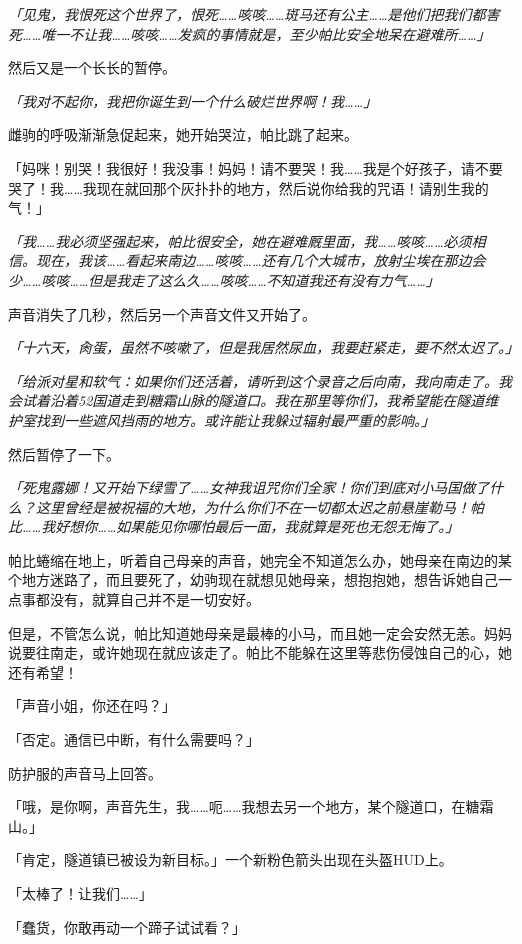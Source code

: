 \emph{「见鬼，我恨死这个世界了，恨死……咳咳……斑马还有公主……是他们把我们都害死……唯一不让我……咳咳……发疯的事情就是，至少帕比安全地呆在避难所……」}

然后又是一个长长的暂停。

\emph{「我对不起你，我把你诞生到一个什么破烂世界啊！我……」}

雌驹的呼吸渐渐急促起来，她开始哭泣，帕比跳了起来。

「妈咪！别哭！我很好！我没事！妈妈！请不要哭！我……我是个好孩子，请不要哭了！我……我现在就回那个灰扑扑的地方，然后说你给我的咒语！请别生我的气！」

\emph{「我……我必须坚强起来，帕比很安全，她在避难厩里面，我……咳咳……必须相信。现在，我该……看起来南边……咳咳……还有几个大城市，放射尘埃在那边会少……咳咳……但是我走了这么久……咳咳……不知道我还有没有力气……」}

声音消失了几秒，然后另一个声音文件又开始了。

\emph{「十六天，肏蛋，虽然不咳嗽了，但是我居然尿血，我要赶紧走，要不然太迟了。」}

\emph{「给派对星和软气：如果你们还活着，请听到这个录音之后向南，我向南走了。我会试着沿着52国道走到糖霜山脉的隧道口。我在那里等你们，我希望能在隧道维护室找到一些遮风挡雨的地方。或许能让我躲过辐射最严重的影响。」}

然后暂停了一下。

\emph{「死鬼露娜！又开始下绿雪了……女神我诅咒你们全家！你们到底对小马国做了什么？这里曾经是被祝福的大地，为什么你们不在一切都太迟之前悬崖勒马！帕比……我好想你……如果能见你哪怕最后一面，我就算是死也无怨无悔了。」}

帕比蜷缩在地上，听着自己母亲的声音，她完全不知道怎么办，她母亲在南边的某个地方迷路了，而且要死了，幼驹现在就想见她母亲，想抱抱她，想告诉她自己一点事都没有，就算自己并不是一切安好。

但是，不管怎么说，帕比知道她母亲是最棒的小马，而且她一定会安然无恙。妈妈说要往南走，或许她现在就应该走了。帕比不能躲在这里等悲伤侵蚀自己的心，她还有希望！

「声音小姐，你还在吗？」

「{\mt 否定。通信已中断，有什么需要吗？}」

防护服的声音马上回答。

「哦，是你啊，声音先生，我……呃……我想去另一个地方，某个隧道口，在糖霜山。」

「{\mt 肯定，隧道镇已被设为新目标。}」一个新粉色箭头出现在头盔HUD上。

「太棒了！让我们……」

「蠢货，你敢再动一个蹄子试试看？」

